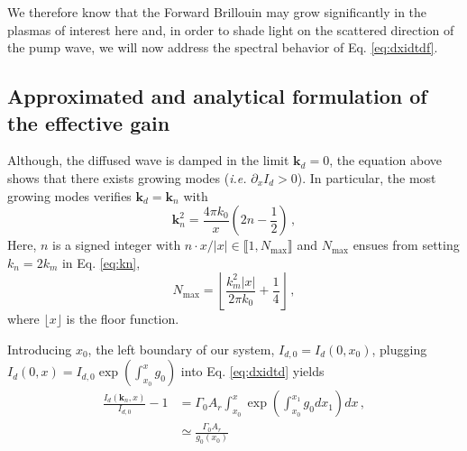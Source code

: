 \documentclass[
 reprint,
 amsmath,amssymb,
 aps,
]{revtex4-1}
\begin{document}
We therefore know that the Forward Brillouin may grow significantly in the plasmas  of interest here and, in order to shade light on the scattered  direction of the pump wave, we will now address the spectral behavior of Eq. \eqref{eq:dxidtdf}.

\subsection{Approximated and analytical formulation of the effective gain}
Although, the diffused wave is damped in the limit $\mathbf{k}_d=0$, the equation above shows that there exists growing modes (\emph{i.e.} $\partial_x I_d>0$). In particular, the most growing modes verifies $\mathbf{k}_d=\mathbf{k}_n$ with 
\begin{equation}\label{eq:kn}
    \mathbf{k}_n^2 =\frac{4\pi k_0}{x} \left(2n- \frac{1}{2}   \right) \, ,
\end{equation}
Here, $n$ is a signed  integer with  $n \cdot x /\vert x\vert\in  \llbracket 1 ,N_\mathrm{max} \rrbracket$ and  $ N_\mathrm{max}$ ensues from setting  $k_n=2k_m$ in Eq. \eqref{eq:kn},
\begin{equation}\label{eq:nmax}
    N_\mathrm{max} =\left\lfloor  \frac{k_m^2\vert x\vert }{2\pi k_0} +\frac{1}{4}   \right\rfloor \,  ,
\end{equation}
where $\lfloor x  \rfloor$ is the floor function.

Introducing $x_0$, the left boundary of our system, $I_{d,0} = I_d(0,x_0)$, plugging $I_d(0,x)=I_{d,0}\exp(\int_{x_0}^xg_0)$ into Eq. \eqref{eq:dxidtd}  yields 
\begin{align}\label{eq:idf}
   \frac{I_d(\mathbf{k}_n,x)}{I_{d,0}}-1& = \Gamma_0 A_r \int_{x_0}^x \exp\left(\int_{x_0}^{x_1} g_0 dx_1\right) dx \,  , \\ 
   &\simeq \frac{\Gamma_0A_r}{g_0(x_0)}
\end{align}
\end{document}

